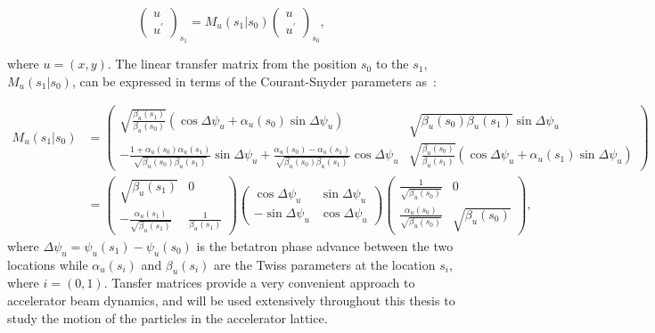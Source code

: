 \begin{equation}\label{eq:matrix_formalism_intro}
   \begin{pmatrix}
    u\\ 
    u^\prime
    \end{pmatrix}_{s_1} = M_u (s_1 |  s_0) \begin{pmatrix}
    u\\ 
    u^\prime
    \end{pmatrix}_{s_0},
\end{equation}

where $u=(x,y)$. The linear transfer matrix from the position $s_0$ to the $s_1$, $M_u (s_1 | s_0)$, can be expressed in terms of the Courant-Snyder parameters as~\cite{Lee:1425444}: %

\begin{equation}\label{eq:linear_transfer_matrix}
    \begin{split}
    M_u (s_1 |  s_0) &= \begin{pmatrix}
        \sqrt{\frac{\beta_u(s_1)}{\beta_u(s_0)}} (\cos{\Delta \psi_u}+\alpha_u (s_0) \sin{\Delta \psi_u}) & \sqrt{\beta_u(s_0)\beta_u(s_1)}\sin{\Delta \psi_u} \\ 
         - \frac{1+\alpha_u(s_0) \alpha_u(s_1)}{\sqrt{\beta_u(s_0) \beta_u(s_1)}} \sin{\Delta \psi_u}+ \frac{\alpha_u(s_0) - \alpha_u(s_1)}{\sqrt{\beta_u(s_0) \beta_u(s_1)}} \cos{\Delta \psi_u} & \sqrt{\frac{\beta_u(s_0)}{\beta_u(s_1)}} (\cos{\Delta \psi_u}+\alpha_u(s_1) \sin{\Delta \psi_u})
        \end{pmatrix} \\ 
        &=\begin{pmatrix}
            \sqrt{\beta_u(s_1)} & 0 \\
            -\frac{\alpha_u(s_1)}{\sqrt{\beta_u(s_1)}}& \frac{1}{\beta_u(s_1)}
            \end{pmatrix} \begin{pmatrix}
            \cos{\Delta \psi_u} & \sin{\Delta \psi_u} \\
            -\sin{\Delta \psi_u}& \cos{\Delta \psi_u}
            \end{pmatrix} \begin{pmatrix}
            \frac{1}{\sqrt{\beta_u(s_0)}} & 0 \\
            \frac{\alpha_u(s_0)}{\sqrt{\beta_u(s_0)}} & \sqrt{\beta_u(s_0)}
            \end{pmatrix},
    \end{split}
\end{equation}
where $\Delta \psi_u = \psi_u(s_1)-\psi_u(s_0)$ is the betatron phase advance between the two locations while $\alpha_u(s_i)$ and $\beta_u(s_i)$ are the Twiss parameters at the location $s_i$, where $i=(0,1)$. Tansfer matrices provide a very convenient approach to accelerator beam dynamics, and will be used extensively throughout this thesis to study the motion of the particles in the accelerator lattice.


